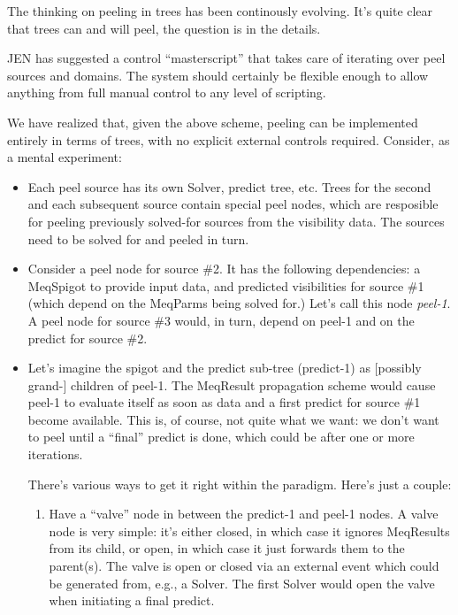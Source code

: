 \documentclass[12pt]{article}
\begin{document}
  The thinking on peeling in trees has been continously evolving. It's quite
  clear that trees can and will peel, the question is in the details.

  JEN has suggested a control ``masterscript'' that takes care of iterating
  over peel sources and domains. The system should certainly be flexible enough
  to allow anything from full manual control to any level of scripting. 
  
  We have realized that, given the above scheme, peeling can be implemented
  entirely in terms of trees, with no explicit external controls required.
  Consider, as a mental experiment:

  \begin{itemize}
  
  \item Each peel source has its own Solver, predict tree, etc. Trees for the
  second and each subsequent source contain special peel nodes, which are
  resposible for peeling previously solved-for sources from the visibility
  data. The sources need to be solved for and peeled in turn.
  
  \item Consider a peel node for source \#2. It has the following dependencies:
  a MeqSpigot to provide input data, and predicted visibilities for source \#1
  (which depend on the MeqParms being solved for.) Let's call this node {\em
  peel-1}. A peel node for source \#3 would, in turn, depend on peel-1 and on
  the predict for source \#2.
  
  \item Let's imagine the spigot and the predict sub-tree (predict-1) as
  [possibly grand-] children of peel-1. The MeqResult propagation scheme would
  cause peel-1 to evaluate itself as soon as data and a first predict for
  source \#1 become available. This is, of course, not quite what we want: we
  don't want to peel until a ``final'' predict is done, which could be after one
  or more iterations.

  There's various ways to get it right within the paradigm. Here's just a
  couple:

  \begin{enumerate}
  
  \item Have a ``valve'' node in between the predict-1 and peel-1 nodes. A
  valve node is very simple: it's either closed, in which case it ignores
  MeqResults from its child, or open, in which case it just forwards them to
  the parent(s). The valve is open or closed via an external event which could
  be generated from, e.g., a Solver. The first Solver would open the valve when
  initiating a final predict.


\end{enumerate}
\end{itemize}
\end{document}
